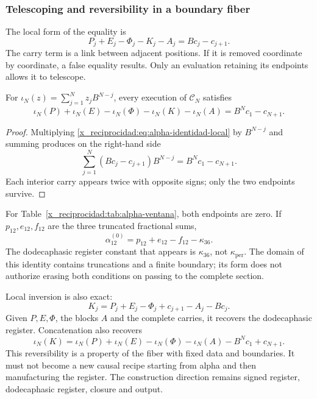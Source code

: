 \subsubsection{Telescoping and reversibility in a boundary fiber}
\label{x_reciprocidad:subsec:alpha-telescopia}

The local form of the equality is
\begin{equation}
 P_j+E_j-\Phi_j-K_j-A_j=Bc_j-c_{j+1}.
 \label{x_reciprocidad:eq:alpha-identidad-local}
\end{equation}
The carry term is a link between adjacent positions. If it is
removed coordinate by coordinate, a false equality results. Only an
evaluation retaining its endpoints allows it to telescope.

\begin{proposition}
\label{x_reciprocidad:prop:alpha-telescopia}
For \(\iota_N(z)=\sum_{j=1}^{N}z_jB^{N-j}\), every execution of
\(\mathcal C_N\) satisfies
\begin{equation}
 \iota_N(P)+\iota_N(E)-\iota_N(\Phi)-\iota_N(K)-\iota_N(A)
 =B^Nc_1-c_{N+1}.
 \label{x_reciprocidad:eq:alpha-telescopia}
\end{equation}
\end{proposition}

\begin{proof}
Multiplying \eqref{x_reciprocidad:eq:alpha-identidad-local} by \(B^{N-j}\) and summing
produces on the right-hand side
\[
 \sum_{j=1}^{N}(Bc_j-c_{j+1})B^{N-j}=B^Nc_1-c_{N+1}.
\]
Each interior carry appears twice with opposite signs; only
the two endpoints survive.
\end{proof}

For Table~\ref{x_reciprocidad:tab:alpha-ventana}, both endpoints are zero. If
\(p_{12},e_{12},f_{12}\) are the three truncated fractional sums,
\[
 \alpha_{12}^{(0)}=p_{12}+e_{12}-f_{12}-\kappa_{36}.
\]
The dodecaphasic register constant that appears is \(\kappa_{36}\), not
\(\kappa_{\mathrm{per}}\). The domain of this identity contains
truncations and a finite boundary; its form does not authorize erasing both
conditions on passing to the complete section.

Local inversion is also exact:
\[
 K_j=P_j+E_j-\Phi_j+c_{j+1}-A_j-Bc_j.
\]
Given \(P,E,\Phi\), the blocks \(A\) and the complete carries,
it recovers the dodecaphasic register. Concatenation also recovers
\[
 \iota_N(K)=\iota_N(P)+\iota_N(E)-\iota_N(\Phi)-\iota_N(A)
             -B^Nc_1+c_{N+1}.
\]
This reversibility is a property of the fiber with fixed data and
boundaries. It must not become a new causal recipe starting from
alpha and then manufacturing the register. The construction direction remains
signed register, dodecaphasic register, closure and output.

